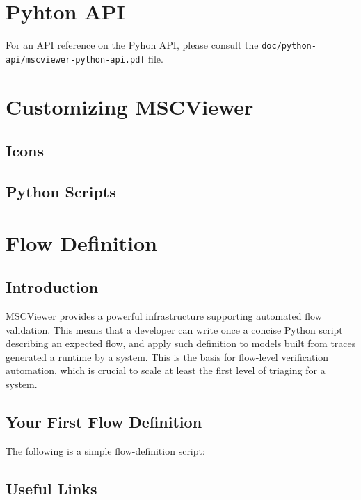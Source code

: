 \documentclass[11pt, twoside, titlepage]{book}
\newcommand{\prog}{MSCViewer}
\begin{document}
\chapter{Pyhton API}
For an API reference on the Pyhon API, please consult the \texttt{doc/python-api/mscviewer-python-api.pdf} file.

\chapter{Customizing \prog}
\section{Icons}
\section{Python Scripts}

\chapter{Flow Definition}
\section{Introduction}
\prog{} provides a powerful infrastructure supporting automated flow validation.
This means that a developer can write once a concise Python script describing an expected flow,
and apply such definition to models built from traces generated a runtime by a system. This
is the basis for flow-level verification automation, which is crucial to scale at least the first
level of triaging for a system.

\section{Your First Flow Definition}
The following is a simple flow-definition script:


\appendix
\section{Useful Links}
\begin{tabular}{l l p{9.0cm}}

\end{tabular}
 
\printindex
\end{document}

